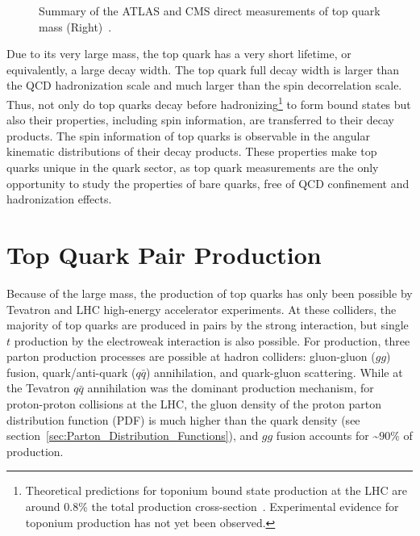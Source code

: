 \begin{refsection}
\begin{figure}[htb]
\begin{center}
{            Summary of the ATLAS and CMS direct measurements of top quark mass (Right)~\cite{LHCTopWGSummaryPlots}.
            }
    \label{QuarkMasses}
  \end{center}
\end{figure}
Due to its very large mass, the top quark has a very short lifetime, or equivalently, a large decay width.
The top quark full decay width is larger than the QCD hadronization scale and much larger than the spin decorrelation scale.
Thus, not only do top quarks decay before hadronizing\footnote{Theoretical predictions for toponium bound state production at the \beamenergy LHC are around 0.8\% the total \ttbar production cross-section~\cite{PhysRevD.104.034023}.  Experimental evidence for toponium production has not yet been observed.} to form bound states but also their properties, including spin information, are transferred to their decay products.
The spin information of top quarks is observable in the angular kinematic distributions of their decay products.
These properties make top quarks unique in the quark sector, as top quark measurements are the only opportunity to study the properties of bare quarks, free of QCD confinement and hadronization effects.

\section{Top Quark Pair Production}
\label{Top_Quark_Pair_Production}
Because of the large mass, the production of top quarks has only been possible by Tevatron and LHC high-energy accelerator experiments.
At these colliders, the majority of top quarks are produced in \ttbar pairs by the strong interaction, but single $t$ production by the electroweak interaction is also possible.
For \ttbar production, three parton production processes are possible at hadron colliders: gluon-gluon ($gg$) fusion, quark/anti-quark ($q\bar{q}$) annihilation, and quark-gluon scattering.
While at the Tevatron $q\bar{q}$ annihilation was the dominant production mechanism, for \beamenergy proton-proton collisions at the LHC, the gluon density of the proton parton distribution function (PDF) is much higher than the quark density (see section~\ref{sec:Parton_Distribution_Functions}), and $gg$ fusion accounts for \sim$90 \%$ of \ttbar production.


\end{refsection}

